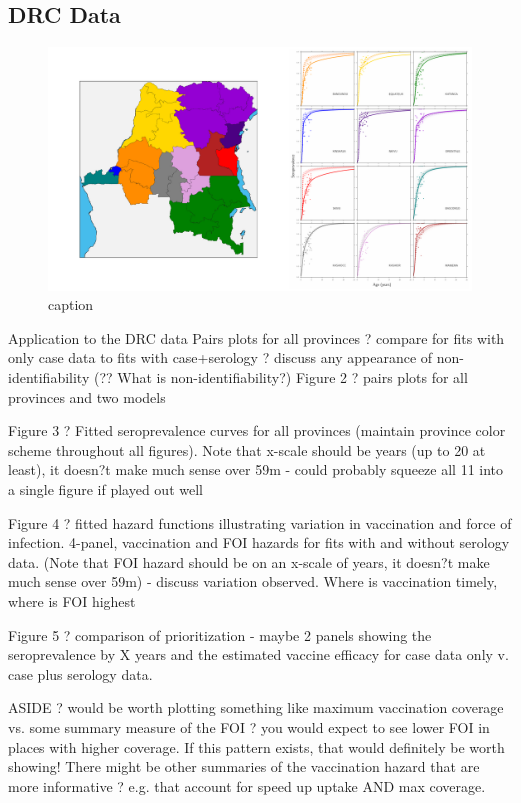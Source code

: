 \documentclass[nofootinbib,aps,pre,twocolumn,superscriptaddress,showkeys,showpacs]{revtex4-1}
\begin{document}
\subsection{DRC Data \label{subsec:DRC}}
\begin{figure}
\includegraphics[width=\textwidth,angle=0]{figures/SeroPlots-crop.pdf}
\caption{caption\label{fig:sero}}
\end{figure}
Application to the DRC data
	Pairs plots for all provinces ? compare for fits with only case data to fits with case+serology ? discuss any appearance of non-identifiability (?? What is non-identifiability?)	
Figure 2 ? pairs plots for all provinces and two models
	

Figure 3 ? Fitted seroprevalence curves for all provinces (maintain province color scheme throughout all figures). Note that x-scale should be years (up to 20 at least), it doesn?t make much sense over 59m
	- could probably squeeze all 11 into a single figure if played out well

Figure 4 ? fitted hazard functions illustrating variation in vaccination and force of infection.  4-panel, vaccination and FOI hazards for fits with and without serology data. (Note that FOI hazard should be on an x-scale of years, it doesn?t make much sense over 59m)
	- discuss variation observed.  Where is vaccination timely, where is FOI highest

Figure 5 ? comparison of prioritization
	- maybe 2 panels showing the seroprevalence by X years and the estimated vaccine efficacy for case data only v. case plus serology data.

	ASIDE ? would be worth plotting something like maximum vaccination coverage vs. some summary measure of the FOI ? you would expect to see lower FOI in places with higher coverage. If this pattern exists, that would definitely be worth showing!  There might be other summaries of the vaccination hazard that are more informative ? e.g. that account for speed up uptake AND max coverage. 
\end{document}
